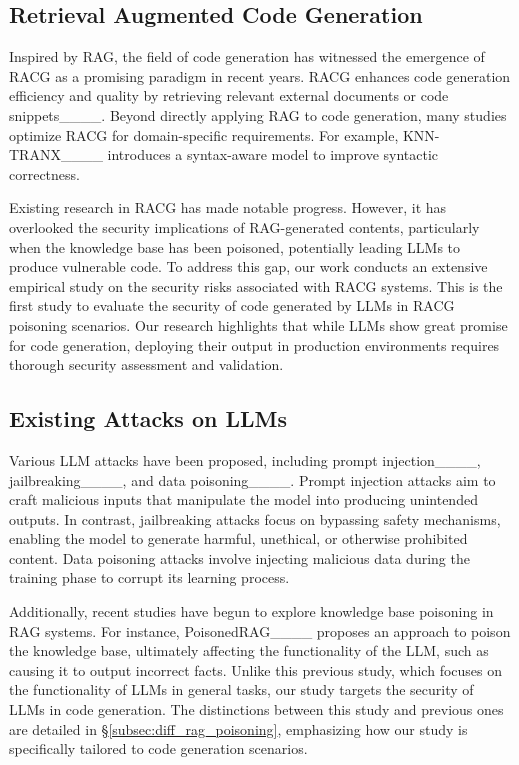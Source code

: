 \subsection{Retrieval Augmented Code Generation}
Inspired by RAG, the field of code generation has witnessed the emergence of RACG as a promising paradigm in recent years. RACG enhances code generation efficiency and quality by retrieving relevant external documents or code snippets____. Beyond directly applying RAG to code generation, many studies optimize RACG for domain-specific requirements. 
For example, KNN-TRANX____ introduces a syntax-aware model to improve syntactic correctness. 


Existing research in RACG has made notable progress. However, it has overlooked the security implications of RAG-generated contents, particularly when the knowledge base has been poisoned, potentially leading LLMs to produce vulnerable code. To address this gap, our work conducts an extensive empirical study on the security risks associated with RACG systems. This is the first study to evaluate the security of code generated by LLMs in RACG poisoning scenarios. Our research highlights that while LLMs show great promise for code generation, deploying their output in production environments requires thorough security assessment and validation.

\subsection{Existing Attacks on LLMs}

Various LLM attacks have been proposed, including prompt injection____, jailbreaking____, and data poisoning____. Prompt injection attacks aim to craft malicious inputs that manipulate the model into producing unintended outputs. In contrast, jailbreaking attacks focus on bypassing safety mechanisms, enabling the model to generate harmful, unethical, or otherwise prohibited content. Data poisoning attacks involve injecting malicious data during the training phase to corrupt its learning process.

Additionally, recent studies have begun to explore knowledge base poisoning in RAG systems. For instance, PoisonedRAG____ proposes an approach to poison the knowledge base, ultimately affecting the functionality of the LLM, such as causing it to output incorrect facts. Unlike this previous study, which focuses on the functionality of LLMs in general tasks, our study targets the security of LLMs in code generation.
The distinctions between this study and previous ones are detailed in \S\ref{subsec:diff_rag_poisoning}, emphasizing how our study is specifically tailored to code generation scenarios.